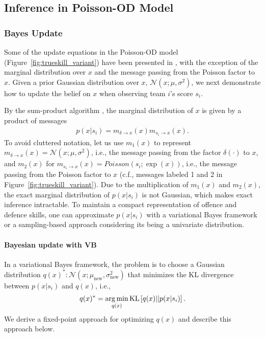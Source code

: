 \subsection{Inference in Poisson-OD Model}
\label{sec:PoissonInference}

\subsubsection{Bayes Update}
Some of the update equations in the Poisson-OD model
(Figure~\ref{fig:trueskill_variant}) have been presented in
\cite{herbrich06569}, with the exception of the marginal distribution
over $x$ and the message passing from the Poisson factor to $x$. Given
a prior Gaussian distribution over $x$, $\mathcal{N}(x;\mu,
\sigma^2)$, we next
demonstrate how to update the belief on $x$ when observing
team $i$'s score $s_i$.

By the sum-product algorithm \cite{kschischang01498}, the
marginal distribution of $x$ is given by a product of messages
\begin{align}\label{eq:marginal}
    p(x|s_i) = m_{\delta \rightarrow x}(x) m_{s_i \rightarrow x}(x).
\end{align}
\unindent To avoid cluttered notation, let us use $m_1(x)$ to represent
$m_{\delta \rightarrow x}(x) = \mathcal{N}(x;\mu,\sigma^2)$, i.e., the message
passing from the factor $\delta(\cdot)$ to $x$, and $m_2(x)$ for
$m_{s_i\rightarrow x}(x) = Poisson(s_i;\exp(x))$, i.e.,
the message passing from the Poisson
factor to $x$ (c.f., messages labeled 1 and 2 in
Figure~\ref{fig:trueskill_variant}). Due to the multiplication of
$m_{1}(x)$ and $m_{2}(x)$, the exact marginal distribution of
$p(x|s_i)$ is not Gaussian, which makes exact inference
intractable. To maintain a compact representation of offence and
defence skills, one can approximate $p(x|s_i)$ with a variational
Bayes framework or a sampling-based approach considering its being a univariate distribution.

\paragraph{\bf Bayesian update with VB}
In a variational Bayes framework, the problem is to choose a Gaussian distribution $q(x)^*:
\mathcal{N}(x;\mu_{\text{new}}, \sigma_{\text{new}}^2)$ that minimizes
the KL divergence between $p(x|s_i)$ and $q(x)$, i.e.,
\begin{align}\label{eq:marginal2}
    q(x)^* = \argmin_{q(x)} \text{KL}\left[q(x)|| p(x|s_i)\right].
\end{align}
We derive a fixed-point approach for optimizing $q(x)$ \cite{Beal:EMFixedPoint02} and describe this approach below.

